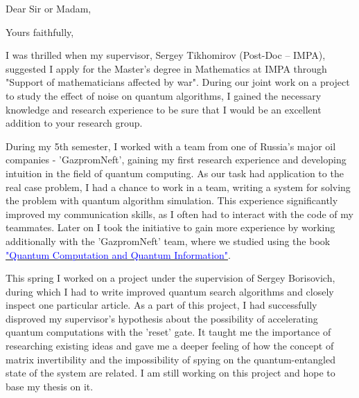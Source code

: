 \documentclass[11pt,a4paper,sans]{moderncv}        %
\begin{document}
	\clearpage
	\date{June 05, 2022}
	\opening{Dear Sir or Madam,}
	\closing{Yours faithfully,}
	\makelettertitle
	
	I was thrilled when my supervisor, Sergey Tikhomirov (Post-Doc – IMPA), suggested I apply for the Master's degree in Mathematics at IMPA through "Support of mathematicians affected by war". During our joint work on a project to study the effect of noise on quantum algorithms, I gained the necessary knowledge and research experience to be sure that I would be an excellent addition to your research group.
	
	During my 5th semester, I worked with a team from one of Russia's major oil companies - 'GazpromNeft', gaining my first research experience and developing intuition in the field of quantum computing. As our task had application to the real case problem, I had a chance to work in a team, writing a system for solving the problem with quantum algorithm simulation. This experience significantly improved my communication skills, as I often had to interact with the code of my teammates. Later on I took the initiative to gain more experience by working additionally with the 'GazpromNeft' team, where we studied using the book \href{https://www.cambridge.org/ru/academic/subjects/physics/quantum-physics-quantum-information-and-quantum-computation/quantum-computation-and-quantum-information-10th-anniversary-edition?format=HB&isbn=9781107002173}{\textcolor{blue}{"Quantum Computation and Quantum Information"}}.
	
	This spring I worked on a project under the supervision of Sergey Borisovich, during which I had to write improved quantum search algorithms and closely inspect one particular article. As a part of this project, I had successfully disproved my supervisor's hypothesis about the possibility of accelerating quantum computations with the 'reset' gate. It taught me the importance of researching existing ideas and gave me a deeper feeling of how the concept of matrix invertibility and the impossibility of spying on the quantum-entangled state of the system are related. I am still working on this project and hope to base my thesis on it.
	
\end{document}
